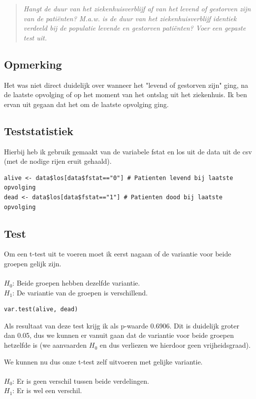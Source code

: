 \documentclass{article}
\begin{document}
\begin{quote}
\textit{
Hangt de duur van het ziekenhuisverblijf af van het levend of gestorven zijn van de
patiënten? M.a.w. is de duur van het ziekenhuisverblijf identiek verdeeld bij de populatie levende en gestorven patiënten? Voer een gepaste test uit.}
\end{quote}

\subsection{Opmerking}
Het was niet direct duidelijk over wanneer het "levend of gestorven zijn" ging, na de laatste opvolging of op het moment van het ontslag uit het ziekenhuis. Ik ben ervan uit gegaan dat het om de laatste opvolging ging.

\subsection{Teststatistiek}
Hierbij heb ik gebruik gemaakt van de variabele fstat en los uit de data uit de csv (met de nodige rijen eruit gehaald).

\begin{verbatim}
alive <- data$los[data$fstat=="0"] # Patienten levend bij laatste opvolging
dead <- data$los[data$fstat=="1"] # Patienten dood bij laatste opvolging
\end{verbatim} 

\subsection{Test}
Om een t-test uit te voeren moet ik eerst nagaan of de variantie voor beide groepen gelijk zijn. \\ \\
$H_0$: Beide groepen hebben dezelfde variantie. \\
$H_1$: De variantie van de groepen is verschillend. 

\begin{verbatim}
var.test(alive, dead)
\end{verbatim}

Als resultaat van deze test krijg ik als p-waarde 0.6906. Dit is duidelijk groter dan 0.05, dus we kunnen er vanuit gaan dat de variantie voor beide groepen hetzelfde is (we aanvaarden $H_0$ en dus verliezen we hierdoor geen vrijheidsgraad).

We kunnen nu dus onze t-test zelf uitvoeren met gelijke variantie. \\ \\
$H_0$: Er is geen verschil tussen beide verdelingen. \\
$H_1$: Er is wel een verschil. 
\end{document}
